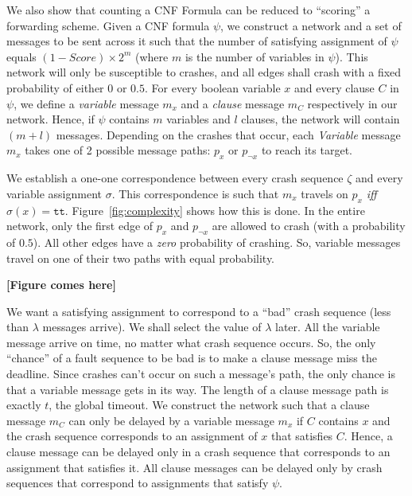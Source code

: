 \documentclass[11pt,eepic]{article}
\renewcommand{\tt}{\texttt{tt}}
\begin{document}
	We also show that counting a CNF Formula can be reduced to ``scoring'' a forwarding scheme. Given a CNF formula $\psi$, we construct a network and a set of messages to be sent across it such that the number of satisfying assignment of $\psi$ equals $(1-Score)\times 2^m$ (where $m$ is the number of variables in $\psi$). This network will only be susceptible to crashes, and all edges shall crash with a fixed probability of either $0$ or $0.5$. For every boolean variable $x$ and every clause $C$ in $\psi$, we define a {\it variable} message $m_x$ and a {\it clause} message $m_C$ respectively in our network. Hence, if $\psi$ contains $m$ variables and $l$ clauses, the network will contain $(m+l)$ messages. Depending on the crashes that occur, each {\it Variable} message $m_x$ takes one of 2 possible message paths: $p_{x}$ or $p_{\neg x}$ to reach its target. 

	We establish a one-one correspondence between every crash sequence $\zeta$ and every variable assignment $\sigma$. This correspondence is such that $m_x$ travels on $p_{x}$ {\it iff} $\sigma(x) = \tt$. Figure~\ref{fig:complexity} shows how this is done. In the entire network, only the first edge of $p_{x}$ and $p_{\neg x}$ are allowed to crash (with a probability of $0.5$). All other edges have a {\it zero} probability of crashing. So, variable messages travel on one of their two paths with equal probability.

	{\bf [Figure comes here]}

	We want a satisfying assignment to correspond to a ``bad'' crash sequence (less than $\lambda$ messages arrive). We shall select the value of $\lambda$ later. All the variable message arrive on time, no matter what crash sequence occurs. So, the only ``chance'' of a fault sequence to be bad is to make a clause message miss the deadline. Since crashes can't occur on such a message's path, the only chance is that a variable message gets in its way. The length of a clause message path is exactly $t$, the global timeout. We construct the network such that a clause message $m_C$ can only be delayed by a variable message $m_x$ if $C$ contains $x$ and the crash sequence corresponds to an assignment of $x$ that satisfies $C$. Hence, a clause message can be delayed only in a crash sequence that corresponds to an assignment that satisfies it. All clause messages can be delayed only by crash sequences that correspond to assignments that satisfy $\psi$.
\end{document}
